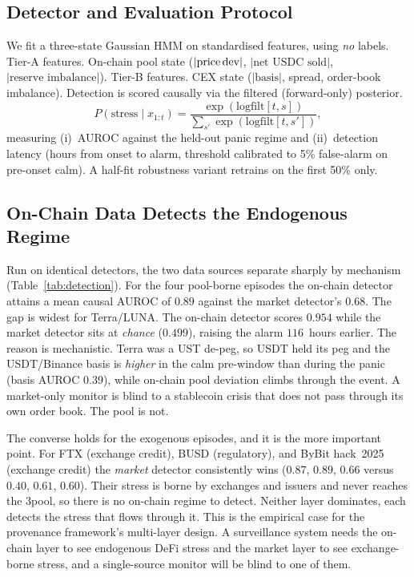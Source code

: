 \documentclass[sigconf,anonymous]{acmart}
\begin{document}
\subsection{Detector and Evaluation Protocol}
\label{sec:detector}

We fit a three-state Gaussian HMM on standardised features, using \emph{no} labels.
Tier-A features. On-chain pool state ($|\text{price\,dev}|$, $|\text{net USDC sold}|$,
$|\text{reserve imbalance}|$). Tier-B features. CEX state ($|\text{basis}|$, spread, order-book imbalance).
Detection is scored causally via the filtered (forward-only) posterior.
\begin{equation}
  P(\text{stress} \mid x_{1:t}) = \frac{\exp({\text{logfilt}}[t, s])}{\sum_{s'} \exp({\text{logfilt}}[t, s'])},
\end{equation}
measuring (i)~AUROC against the held-out panic regime and (ii)~detection latency
(hours from onset to alarm, threshold calibrated to 5\% false-alarm on pre-onset calm).
A half-fit robustness variant retrains on the first 50\% only.

\subsection{On-Chain Data Detects the Endogenous Regime}
\label{sec:detection}

Run on identical detectors, the two data sources separate sharply by mechanism
(Table~\ref{tab:detection}).  For the four
pool-borne episodes the on-chain detector attains a mean causal AUROC of $0.89$
against the market detector's $0.68$.  The gap is widest for Terra/LUNA. The
on-chain detector scores $0.954$ while the market detector sits at \emph{chance}
($0.499$), raising the alarm $116$~hours earlier.  The reason is mechanistic.
Terra was a UST de-peg, so USDT held its peg and the USDT/Binance basis is
\emph{higher} in the calm pre-window than during the panic (basis AUROC $0.39$),
while on-chain pool deviation climbs through the event.  A market-only monitor is
blind to a stablecoin crisis that does not pass through its own order book. The pool is not.

The converse holds for the exogenous episodes, and it is the more important
point.  For FTX (exchange credit), BUSD (regulatory), and ByBit hack~2025 (exchange credit) the \emph{market}
detector consistently wins ($0.87$, $0.89$, $0.66$ versus $0.40$, $0.61$, $0.60$). Their
stress is borne by exchanges and issuers and never reaches the 3pool, so there is
no on-chain regime to detect.  Neither layer dominates, each detects the
stress that flows through it.  This is the empirical case for the provenance
framework's multi-layer design. A surveillance system needs the on-chain layer to
see endogenous DeFi stress and the market layer to see exchange-borne stress, and
a single-source monitor will be blind to one of them.
\end{document}
